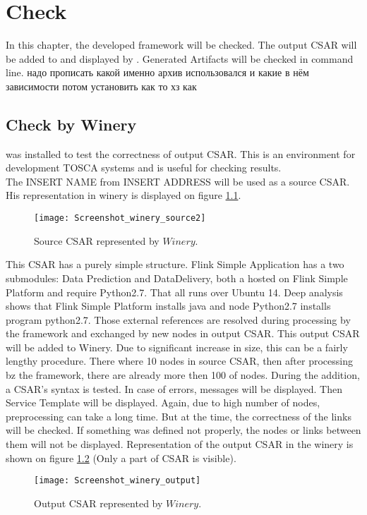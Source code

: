 
\chapter{Check}\label{chap:check}
In this chapter, the developed framework will be checked.
The output CSAR will be added to and displayed by .
Generated Artifacts will be checked in command line.
надо прописать какой именно архив использовался и какие в нём зависимости
потом установить как то хз как
\fi
\section{Check by Winery}
  was installed to test the correctness of output CSAR. 
 This is an environment for development TOSCA systems and is useful for checking results. \\
 The INSERT NAME from INSERT ADDRESS will be used as a source CSAR. 
 His representation in winery is displayed on figure \ref{fig:winery_source2}.
\begin{figure}[ht]   
	\centering
	\texttt{[image: Screenshot\_winery\_source2]}
	\caption{Source CSAR represented by $Winery$.}
	\label{fig:winery_source2}
\end{figure}
 This CSAR has a purely simple structure.
 Flink Simple Application has a two submodules: Data Prediction and DataDelivery, both a hosted on Flink Simple Platform and require Python2.7. 
 That all runs over Ubuntu 14.
 Deep analysis shows that Flink Simple Platform installs java and node Python2.7 installs program python2.7.
 Those external references are resolved during processing by the framework and exchanged by new nodes in output CSAR.
 This output CSAR will be added to Winery.
 Due to significant increase in size, this can be a fairly lengthy procedure.
 There where 10 nodes in source CSAR, then after processing bz the framework, there are already more then 100 of nodes.
 During the addition, a CSAR's syntax is tested.
 In case of errors, messages will be displayed.
 Then Service Template will be displayed.
 Again, due to high number of nodes, preprocessing can take a long time. 
 But at the time, the correctness of the links will be checked.
 If something was defined not properly, the nodes or links between them will not be displayed.
Representation of the output CSAR in the winery is shown on figure \ref{fig:winery_output} (Only a part of CSAR is visible).
\begin{figure}[ht]   
	\centering
	\texttt{[image: Screenshot\_winery\_output]}  
	\caption{Output CSAR represented by $Winery$.}
	\label{fig:winery_output}
\end{figure}
